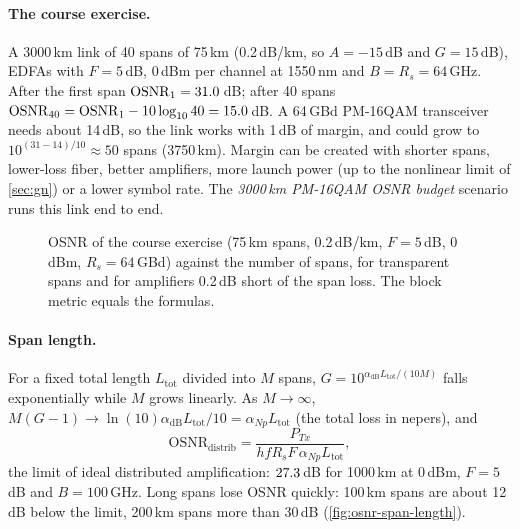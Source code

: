 \paragraph{The course exercise.} A 3000\,km link of 40 spans of 75\,km (0.2\,dB/km, so $A=-15$\,dB and
$G=15$\,dB), EDFAs with $F=5$\,dB, 0\,dBm per channel at 1550\,nm and $B=R_s=64$\,GHz. After the first span
$\mathrm{OSNR}_1=31.0$\,dB; after 40 spans $\mathrm{OSNR}_{40}=\mathrm{OSNR}_1-10\log_{10}40=15.0$\,dB. A 64\,GBd PM-16QAM
transceiver needs about 14\,dB, so the link works with 1\,dB of margin, and could grow to
$10^{(31-14)/10}\approx50$ spans (3750\,km). Margin can be created with shorter spans, lower-loss fiber,
better amplifiers, more launch power (up to the nonlinear limit of \cref{sec:gn}) or a lower symbol
rate. The \emph{3000\,km PM-16QAM OSNR budget} scenario runs this link end to end.

\begin{figure}[htbp]
\centering
{}
\caption{OSNR of the course exercise (75\,km spans, 0.2\,dB/km, $F=5$\,dB, 0\,dBm, $R_s=64$\,GBd) against the
number of spans, for transparent spans and for amplifiers 0.2\,dB short of the span loss. The block
metric equals the formulas.}
\label{fig:osnr-spans}
\end{figure}

\paragraph{Span length.} For a fixed total length $L_{\mathrm{tot}}$ divided into $M$ spans, $G=10^{\alpha_{\mathrm{dB}}L_{\mathrm{tot}}/(10M)}$
falls exponentially while $M$ grows linearly. As $M\to\infty$,
$M(G-1)\to\ln(10)\alpha_{\mathrm{dB}}L_{\mathrm{tot}}/10=\alpha_{Np}L_{\mathrm{tot}}$ (the total loss in nepers), and
\begin{equation}
  \mathrm{OSNR}_{\mathrm{distrib}}=\frac{P_{Tx}}{hfR_sF\,\alpha_{Np}L_{\mathrm{tot}}},
\end{equation}
the limit of ideal distributed amplification: $27.3$\,dB for 1000\,km at 0\,dBm, $F=5$\,dB and
$B=100$\,GHz. Long spans lose OSNR quickly: 100\,km spans are about 12\,dB below the limit, 200\,km spans
more than 30\,dB (\cref{fig:osnr-span-length}).

